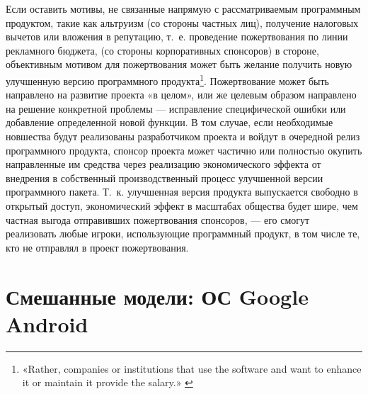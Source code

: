 \documentclass{article}
\begin{document}
Если оставить мотивы, не связанные напрямую с рассматриваемым программным продуктом, такие как альтруизм (со стороны частных лиц), получение налоговых вычетов или вложения в репутацию, т.~е. проведение пожертвования по линии рекламного бюджета, (со стороны корпоративных спонсоров) в стороне, объективным мотивом для пожертвования может быть желание получить новую улучшенную версию программного продукта\footnote{«Rather, companies or institutions that use the software and want to enhance it or maintain it provide the salary.» \cite{apacheFunding}}. Пожертвование может быть направлено на развитие проекта «в целом», или же целевым образом направлено на решение конкретной проблемы — исправление специфической ошибки или добавление определенной новой функции. В том случае, если необходимые новшества будут реализованы разработчиком проекта и войдут в очередной релиз программного продукта, спонсор проекта может частично или полностью окупить направленные им средства через реализацию экономического эффекта от внедрения в собственный производственный процесс улучшенной версии программного пакета. Т.~к. улучшенная версия продукта выпускается свободно в открытый доступ, экономический эффект в масштабах общества будет шире, чем частная выгода отправивших пожертвования спонсоров, — его смогут реализовать любые игроки, использующие программный продукт, в том числе те, кто не отправлял в проект пожертвования.

\section*{Смешанные модели: ОС Google Android}
\end{document}
